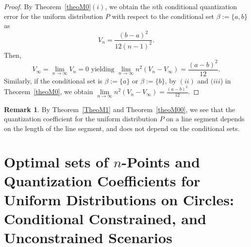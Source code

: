 \documentclass[12pt, reqno]{amsart}
\theoremstyle{plain}
\theoremstyle{definition}
\newtheorem{remark}[subsection]{Remark}
\newcommand{\set}[1]{\{#1\}}%
\newcommand{\gb}{\beta}
\newcommand{\te}{\text}%
\begin{document}
\begin{proof}
By Theorem~\ref{theoM0}$(i)$, we obtain the $n$th conditional quantization error for the uniform distribution $P$ with respect to the conditional set $\gb:=\set{a, b}$ as 
\[V_n=\frac {(b-a)^2}{12(n-1)^2}.\]
Then, \[V_\infty=\mathop{\lim}\limits_{n\to\infty} V_n=0 \te{ yielding } \lim\limits_{n\to \infty} n^2 (V_n-V_\infty)=\frac{(a-b)^2}{12}.\]
Similarly, if the conditional set is $\gb:=\set{a}$ or $\gb:=\set{b}$, by $(ii)$ and $(iii$) in Theorem~\ref{theoM0}, we obtain $\lim\limits_{n\to \infty} n^2 (V_n-V_\infty)=\frac{(a-b)^2}{12}$. 
\end{proof} 

\begin{remark} \label{rem3}
By Theorem~\ref{TheoM1} and Theorem~\ref{theoM00}, we see that the quantization coefficient for the uniform distribution $P$ on a line segment depends on the length of the line segment, and does not depend on the conditional sets. 
\end{remark}

 

 
\section{Optimal sets of $n$-Points and Quantization Coefficients for Uniform Distributions on Circles: Conditional Constrained, and Unconstrained Scenarios} \label{sec3} 
  
\end{document}
